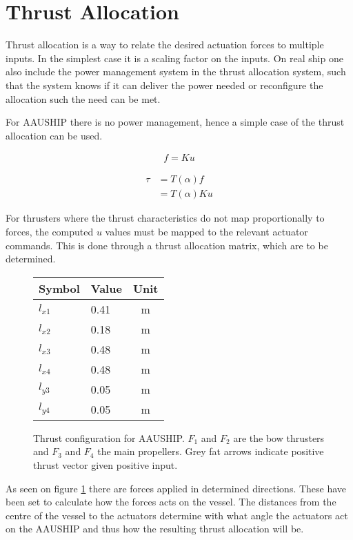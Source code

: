 \section{Thrust Allocation}
\label{sec:thrust_allocation}
Thrust allocation is a way to relate the desired actuation forces to multiple inputs. In the simplest case it is a scaling factor on the inputs. On real ship one also include the power management system in the thrust allocation system, such that the system knows if it can deliver the power needed or reconfigure the allocation such the need can be met.

For AAUSHIP there is no power management, hence a simple case of the thrust allocation can be used.

\begin{align}
f  = K u
\label{eq:fKu}
\end{align}

\begin{subequations}
\begin{align}
 \tau &=  T ( \alpha)  f\\
&=  T (  \alpha)  K  u
\end{align}
\end{subequations}

For thrusters where the thrust characteristics do not map
proportionally to forces, the computed $u$ values must be mapped
to the relevant actuator commands. This is done through a thrust allocation matrix, which are to be determined.

\begin{figure}[htbp]
	\centering
	\begin{minipage}[l]{0.3\textwidth}
		\begin{tabular}{llc}
		\toprule
		Symbol & Value & Unit\\
		\midrule
		$l_{x1}$& 0.41 & m\\
		$l_{x2}$& 0.18 & m\\
		$l_{x3}$& 0.48 & m\\
		$l_{x4}$& 0.48 & m\\
		$l_{y3}$& 0.05 & m\\
		$l_{y4}$& 0.05 & m\\
		\bottomrule
		\end{tabular}
	\end{minipage}%
\noindent
	\begin{minipage}[l]{0.7\textwidth}
		
	\end{minipage}
	\caption{Thrust configuration for AAUSHIP. $F_1$ and $F_2$ are the
	bow thrusters and $F_3$ and $F_4$ the main propellers. Grey fat
arrows indicate positive thrust vector given positive input.} 
	\label{fig:thrust_allocation}
\end{figure}
As seen on figure \ref{sec:thrust_allocation} there are forces applied in determined directions. These have been set to calculate how the forces acts on the vessel. The distances from the centre of the vessel to the actuators determine with what angle the actuators act on the AAUSHIP and thus how the resulting thrust allocation will be.

